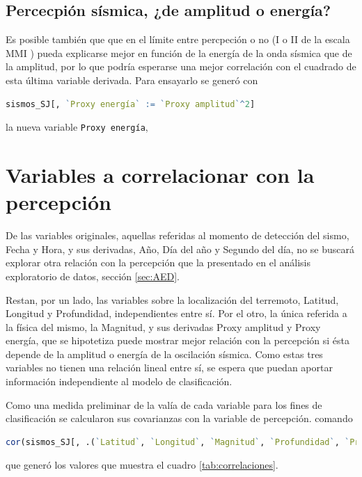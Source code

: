 \documentclass[a4paper]{report}
\begin{document}
\subsection{Percecpión sísmica, ¿de amplitud o energía?}
Es posible también que que en el límite entre percpeción o no (I o II de la escala MMI \cite{noauthor_intensidad_2022}) pueda explicarse mejor en función de la energía de la onda sísmica que de la amplitud, por lo que podría esperarse una mejor correlación con el cuadrado de esta última variable derivada.
Para ensayarlo se generó con
\begin{lstlisting}[breaklines=true, language=R]
sismos_SJ[, `Proxy energía` := `Proxy amplitud`^2]
\end{lstlisting}
la nueva variable \lstinline[language = R]'Proxy energía', 


\section{Variables a correlacionar con la percepción}
De las variables originales, aquellas referidas al momento de detección del sismo, Fecha y Hora, y sus derivadas, Año, Día del año y Segundo del día, no se buscará explorar otra relación con la percepción que la presentado en el análisis exploratorio de datos, sección \ref{sec:AED}.

Restan, por un lado, las variables sobre la localización del terremoto, Latitud, Longitud y Profundidad, independientes entre sí.
Por el otro, la única referida a la física del mismo, la Magnitud, y sus derivadas Proxy amplitud y Proxy energía, que se hipotetiza puede mostrar mejor relación con la percepción si ésta depende de la amplitud o energía de la oscilación sísmica.
Como estas tres variables no tienen una relación lineal entre sí, se espera que puedan aportar información independiente al modelo de clasificación.

Como una medida preliminar de la valía de cada variable para los fines de clasificación se calcularon sus covarianzas con la variable de percepción.
 comando
\begin{lstlisting}[breaklines=true, language=R]
 cor(sismos_SJ[, .(`Latitud`, `Longitud`, `Magnitud`, `Profundidad`, `Proxy amplitud`, `Proxy energia`, Percibido)])
\end{lstlisting}	
 que generó los valores que muestra el cuadro \ref{tab:correlaciones}. 
\end{document}
